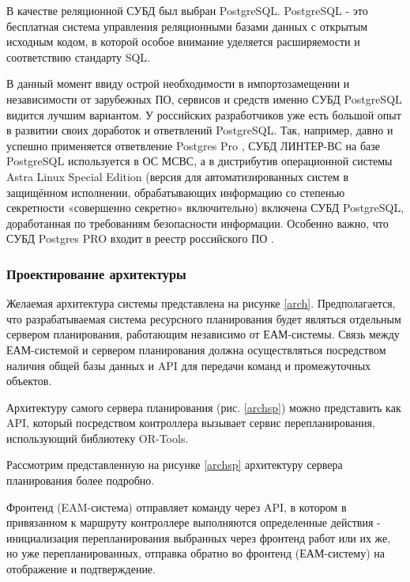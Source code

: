 В качестве реляционной СУБД был выбран PostgreSQL. PostgreSQL - это бесплатная система управления реляционными базами данных с открытым исходным кодом, в которой особое внимание уделяется расширяемости и соответствию стандарту SQL.

В данный момент ввиду острой необходимости в импортозамещении и независимости от зарубежных ПО, сервисов и средств именно СУБД PostgreSQL видится лучшим вариантом. У российских разработчиков уже есть большой опыт в развитии своих доработок и ответвлений PostgreSQL. Так, например, давно и успешно применяется ответвление Postgres Pro \cite{postgrespro}, СУБД ЛИНТЕР-ВС на базе PostgreSQL используется в ОС МСВС, а в дистрибутив операционной системы Astra Linux Special Edition (версия для автоматизированных систем в защищённом исполнении, обрабатывающих информацию со степенью секретности «совершенно секретно» включительно) включена СУБД PostgreSQL, доработанная по требованиям безопасности информации. Особенно важно, что СУБД Postgres PRO входит в реестр российского ПО \cite{reestrpp}.

\subsubsection{Проектирование архитектуры}

Желаемая архитектура системы представлена на рисунке \ref{arch}. Предполагается, что разрабатываемая система ресурсного планирования будет являться отдельным сервером планирования, работающим независимо от ЕАМ-системы. Связь между ЕАМ-системой и сервером планирования должна осуществляться посредством наличия общей базы данных и API для передачи команд и промежуточных объектов.


Архитектуру самого сервера планирования (рис. \ref{archsp}) можно представить как API, который посредством контроллера вызывает сервис перепланирования, использующий библиотеку OR-Tools.


Рассмотрим представленную на рисунке \ref{archsp} архитектуру сервера планирования более подробно.

Фронтенд (EAM-система) отправляет команду через API, в котором в привязанном к маршруту контроллере выполняются определенные действия - инициализация перепланирования выбранных через фронтенд работ или их же, но уже перепланированных, отправка обратно во фронтенд (ЕАМ-систему) на отображение и подтверждение.

